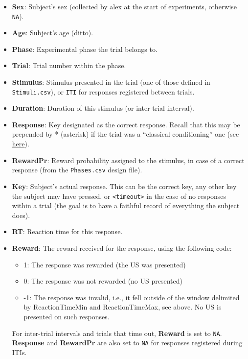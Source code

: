 \documentclass[11pt,]{article}
\begin{document}
\begin{itemize}
\item
  \textbf{Sex}: Subject's sex (collected by alex at the start of
  experiments, otherwise \texttt{NA}).
\item
  \textbf{Age}: Subject's age (ditto).
\item
  \textbf{Phase}: Experimental phase the trial belongs to.
\item
  \textbf{Trial}: Trial number within the phase.
\item
  \textbf{Stimulus}: Stimulus presented in the trial (one of those
  defined in \texttt{Stimuli.csv}), or \texttt{ITI} for responses
  registered between trials.
\item
  \textbf{Duration}: Duration of this stimulus (or inter-trial
  interval).
\item
  \textbf{Response}: Key designated as the correct response. Recall that
  this may be prepended by * (asterisk) if the trial was a ``classical
  conditioning'' one (see \hyperref[responses]{here}).
\item
  \textbf{RewardPr}: Reward probability assigned to the stimulus, in
  case of a correct response (from the \texttt{Phases.csv} design file).
\item
  \textbf{Key}: Subject's actual response. This can be the correct key,
  any other key the subject may have pressed, or
  \texttt{\textless{}timeout\textgreater{}} in the case of no responses
  within a trial (the goal is to have a faithful record of everything
  the subject does).
\item
  \textbf{RT}: Reaction time for this response.
\item
  \textbf{Reward}: The reward received for the response, using the
  following code:

  \begin{itemize}
  \item
    1: The response was rewarded (the US was presented)
  \item
    0: The response was not rewarded (no US presented)
  \item
    -1: The response was invalid, i.e., it fell outside of the window
    delimited by ReactionTimeMin and ReactionTimeMax, see above. No US
    is presented on such responses.
  \end{itemize}

  For inter-trial intervals and trials that time out, \textbf{Reward} is
  set to \texttt{NA}. \textbf{Response} and \textbf{RewardPr} are also
  set to \texttt{NA} for responses registered during ITIs.
\end{itemize}
\end{document}
